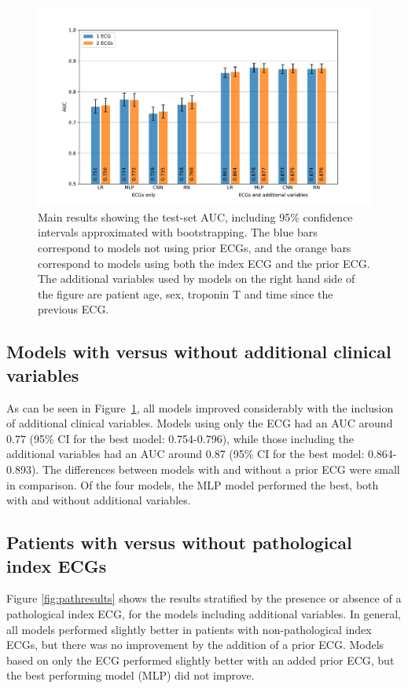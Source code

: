 \documentclass[preprint]{elsarticle}
\begin{document}
\begin{figure}[h!]
\includegraphics[width=\linewidth]{figures/main_results.pdf}
\caption{Main results showing the test-set AUC, including 95\% confidence intervals approximated with bootstrapping. The blue bars correspond to models not using prior ECGs, and the orange bars correspond to models using both the index ECG and the prior ECG. The additional variables used by models on the right hand side of the figure are patient age, sex, troponin T and time since the previous ECG.}
\label{fig:mainresults}
\end{figure}

\subsection{Models with versus without additional clinical variables}
As can be seen in Figure~\ref{fig:mainresults}, all models improved considerably with the inclusion of additional clinical variables. Models using only the ECG had an AUC around 0.77 (95\% CI for the best model: 0.754-0.796), while those including the additional variables had an AUC around 0.87 (95\% CI for the best model: 0.864-0.893). The differences between models with and without a prior ECG were small in comparison. Of the four models, the MLP model performed the best, both with and without additional variables.

\subsection{Patients with versus without pathological index ECGs}
Figure \ref{fig:pathresults} shows the results stratified by the presence or absence of a pathological index ECG, for the models including additional variables. In general, all models performed slightly better in patients with non-pathological index ECGs, but there was no improvement by the addition of a prior ECG. Models based on only the ECG performed slightly better with an added prior ECG, but the best performing model (MLP) did not improve. 
\end{document}
